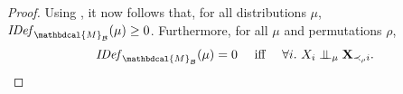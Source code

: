 \documentclass[letterpaper]{article} %
\theoremstyle{plain}
\theoremstyle{definition}
\theoremstyle{remark}
\let\H\relax
\DeclareMathOperator{\H}{\mathrm{H}} %
\newcommand{\CI}{\mathrel{\perp\mspace{-10mu}\perp}} %
\newcommand{\dg}[1]{\mathbdcal{#1}}
\newcommand\Pa{\mathbf{Pa}}
\newcommand{\IDef}[1]{\mathit{IDef}_{#1}}
\newcommand{\PDGof}[1]{{\dg M}_{#1}}
\begin{document}
\begin{proof}
Using , it now follows that,
for all distributions $\mu$,
$\IDef{\PDGof{\mathcal B}}(\mu) \ge 0$.
Furthermore, for all $\mu$ and permutations $\rho$,
\begin{equation}\label{eq:key}
  \IDef{\PDGof{\mathcal B}}(\mu) = 0 \quad\mbox{ iff }\quad 
    \forall i.~X_i \CI_\mu {\bf X}_{\prec_\rho i}.
\end{equation}


\end{proof}
\end{document}
